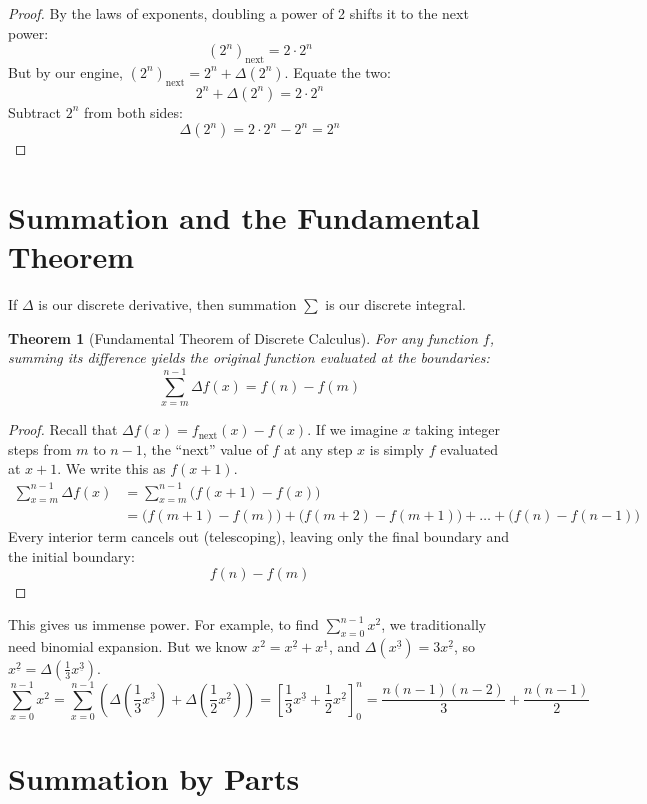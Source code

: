 \documentclass[12pt]{article}
\newtheorem{theorem}{Theorem}
\newcommand{\next}[1]{#1_{\text{next}}}
\newcommand{\falling}[2]{{#1}^{\underline{#2}}}
\begin{document}
\begin{proof}
By the laws of exponents, doubling a power of 2 shifts it to the next power:
\[ \next{(2^n)} = 2 \cdot 2^n \]
But by our engine, $\next{(2^n)} = 2^n + \Delta(2^n)$. Equate the two:
\[ 2^n + \Delta(2^n) = 2 \cdot 2^n \]
Subtract $2^n$ from both sides:
\[ \Delta(2^n) = 2 \cdot 2^n - 2^n = 2^n \]
\end{proof}

\section{Summation and the Fundamental Theorem}

If $\Delta$ is our discrete derivative, then summation $\sum$ is our discrete integral.

\begin{theorem}[Fundamental Theorem of Discrete Calculus]
For any function $f$, summing its difference yields the original function evaluated at the boundaries:
\[ \sum_{x=m}^{n-1} \Delta f(x) = f(n) - f(m) \]
\end{theorem}

\begin{proof}
Recall that $\Delta f(x) = \next{f}(x) - f(x)$. If we imagine $x$ taking integer steps from $m$ to $n-1$, the ``next'' value of $f$ at any step $x$ is simply $f$ evaluated at $x+1$. We write this as $f(x+1)$. 
\begin{align*}
    \sum_{x=m}^{n-1} \Delta f(x) &= \sum_{x=m}^{n-1} \big( f(x+1) - f(x) \big) \\
    &= \big(f(m+1) - f(m)\big) + \big(f(m+2) - f(m+1)\big) + \dots + \big(f(n) - f(n-1)\big)
\end{align*}
Every interior term cancels out (telescoping), leaving only the final boundary and the initial boundary:
\[ f(n) - f(m) \]
\end{proof}

This gives us immense power. For example, to find $\sum_{x=0}^{n-1} x^2$, we traditionally need binomial expansion. But we know $x^2 = \falling{x}{2} + \falling{x}{1}$, and $\Delta(\falling{x}{3}) = 3\falling{x}{2}$, so $\falling{x}{2} = \Delta\left(\frac{1}{3}\falling{x}{3}\right)$. 
\[ \sum_{x=0}^{n-1} x^2 = \sum_{x=0}^{n-1} \left( \Delta\left(\frac{1}{3}\falling{x}{3}\right) + \Delta\left(\frac{1}{2}\falling{x}{2}\right) \right) = \left[ \frac{1}{3}\falling{x}{3} + \frac{1}{2}\falling{x}{2} \right]_0^n = \frac{n(n-1)(n-2)}{3} + \frac{n(n-1)}{2} \]

\section{Summation by Parts}
\end{document}

